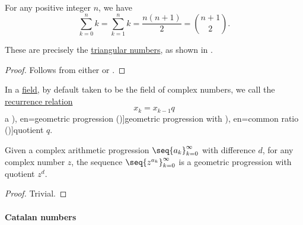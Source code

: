 \begin{corollary}\label{thm:numeric_arithmetic_progression_partial_sums}
  For any positive integer \( n \), we have
  \begin{equation}\label{eq:thm:numeric_arithmetic_progression_partial_sums}
    \sum_{k=0}^n k = \sum_{k=1}^n k = \frac {n (n + 1)} 2 = \binom {n+1} 2.
  \end{equation}
\end{corollary}
\begin{comments}
  \item These are precisely the \hyperref[def:triangular_number]{triangular numbers}, as shown in .
\end{comments}
\begin{proof}
  Follows from either  or .
\end{proof}

\begin{definition}\label{def:geometric_progression}
  In a \hyperref[def:field]{field}, by default taken to be the field of complex numbers, we call the \hyperref[def:recurrence_relation]{recurrence relation}
  \begin{equation}\label{eq:def:geometric_progression}
    x_k = x_{k-1} q
  \end{equation}
  a \term[ru=геометрическая прогрессия (\cite[144]{АлександровМаркушевичХинчин1952ЭнциклопедияТом3}), en=geometric progression (\cite[def. 2.4.2]{Rosen2019DiscreteMathematics})]{geometric progression} with \term[ru=знаменатель (прогрессии) (\cite[\S 227]{Киселёв2004Геометрия}), en=common ratio (\cite[def. 2.4.2]{Rosen2019DiscreteMathematics})]{quotient} \( q \).
\end{definition}

\begin{proposition}\label{thm:arithmetic_to_geometric_progression}
  Given a complex arithmetic progression \( \seq{ a_k }_{k=0}^\infty \) with difference \( d \), for any complex number \( z \), the sequence \( \seq{ z^{a_k} }_{k=0}^\infty \) is a geometric progression with quotient \( z^d \).
\end{proposition}
\begin{proof}
  Trivial.
\end{proof}

\paragraph{Catalan numbers}

